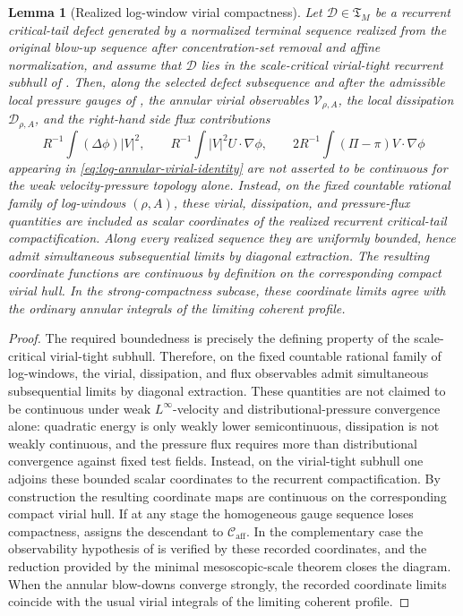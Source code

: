 \documentclass[11pt]{amsart}
\numberwithin{equation}{section}
\theoremstyle{plain}
\newtheorem{lemma}[lemma]{Lemma}
\theoremstyle{definition}
\theoremstyle{remark}
\newcommand{\Caff}{\mathcal C_{\mathrm{aff}}}
\newcommand{\Tcrit}{\mathfrak T_M}
\begin{document}
\begin{lemma}[Realized log-window virial compactness]
\label{lem:realized-log-window-virial-compactness}
Let \(\mathcal D\in\Tcrit\) be a recurrent critical-tail defect generated by a
normalized terminal sequence realized from the original blow-up sequence after concentration-set removal and
affine normalization, and assume that \(\mathcal D\) lies in the scale-critical
virial-tight recurrent subhull of
.  Then, along the selected
defect subsequence and after the admissible local pressure gauges of
, the annular virial observables
\(\mathcal V_{\rho,A}\), the local dissipation \(\mathcal D_{\rho,A}\), and the
right-hand side flux contributions
\[
   R^{-1}\int(\Delta\phi)|V|^2 ,\qquad
   R^{-1}\int|V|^2 U\cdot\nabla\phi ,\qquad
   2R^{-1}\int(\Pi-\pi)V\cdot\nabla\phi
\]
appearing in \eqref{eq:log-annular-virial-identity} are \emph{not} asserted to
be continuous for the weak velocity-pressure topology alone.  Instead, on the
fixed countable rational family of log-windows \((\rho,A)\), these virial,
dissipation, and pressure-flux quantities are included as scalar coordinates of
the realized recurrent critical-tail compactification.  Along every realized
sequence they are uniformly bounded, hence admit simultaneous subsequential
limits by diagonal extraction.  The resulting coordinate functions are
continuous by definition on the corresponding compact virial hull.  In the
strong-compactness subcase, these coordinate limits agree with the ordinary
annular integrals of the limiting coherent profile.
\end{lemma}

\begin{proof}
The required boundedness is precisely the defining property of the
scale-critical virial-tight subhull.  Therefore, on the fixed countable
rational family of log-windows, the virial, dissipation, and flux observables
admit simultaneous subsequential limits by diagonal extraction.  These
quantities are not claimed to be continuous under weak \(L^\infty\)-velocity
and distributional-pressure convergence alone: quadratic energy is only weakly
lower semicontinuous, dissipation is not weakly continuous, and the pressure
flux requires more than distributional convergence against fixed test fields.
Instead, on the virial-tight subhull one adjoins these bounded scalar
coordinates to the recurrent compactification.  By construction the resulting
coordinate maps are continuous on the corresponding compact virial hull.  If at
any stage the homogeneous gauge sequence loses compactness,
 assigns the descendant to \(\Caff\).
In the complementary case the observability hypothesis of
 is verified by these recorded
coordinates, and the reduction provided by the minimal mesoscopic-scale theorem
 closes the diagram.  When the annular
blow-downs converge strongly, the recorded coordinate limits coincide with the
usual virial integrals of the limiting coherent profile.
\end{proof}
\end{document}
